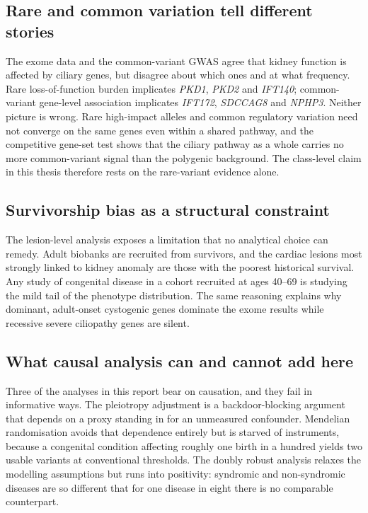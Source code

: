 \documentclass[11pt,a4paper]{article}
\newcommand{\gene}[1]{\textit{#1}}
\begin{document}
\subsection{Rare and common variation tell different stories}

The exome data and the common-variant GWAS agree that kidney function is affected by
ciliary genes, but disagree about which ones and at what frequency. Rare loss-of-function
burden implicates \gene{PKD1}, \gene{PKD2} and \gene{IFT140}; common-variant gene-level
association implicates \gene{IFT172}, \gene{SDCCAG8} and \gene{NPHP3}. Neither picture is
wrong. Rare high-impact alleles and common regulatory variation need not converge on the
same genes even within a shared pathway, and the competitive gene-set test shows that the
ciliary pathway as a whole carries no more common-variant signal than the polygenic
background. The class-level claim in this thesis therefore rests on the rare-variant
evidence alone.

\subsection{Survivorship bias as a structural constraint}
\label{sec:survivorship}

The lesion-level analysis exposes a limitation that no analytical choice can remedy. Adult
biobanks are recruited from survivors, and the cardiac lesions most strongly linked to kidney
anomaly are those with the poorest historical survival. Any study of congenital disease in a
cohort recruited at ages 40--69 is studying the mild tail of the phenotype distribution. The
same reasoning explains why dominant, adult-onset cystogenic genes dominate the exome
results while recessive severe ciliopathy genes are silent.


\subsection{What causal analysis can and cannot add here}

Three of the analyses in this report bear on causation, and they fail in informative ways.
The pleiotropy adjustment is a backdoor-blocking argument that depends on a proxy standing in
for an unmeasured confounder. Mendelian randomisation avoids that dependence entirely but is
starved of instruments, because a congenital condition affecting roughly one birth in a
hundred yields two usable variants at conventional thresholds. The doubly robust analysis
relaxes the modelling assumptions but runs into positivity: syndromic and non-syndromic
diseases are so different that for one disease in eight there is no comparable counterpart.
\end{document}
